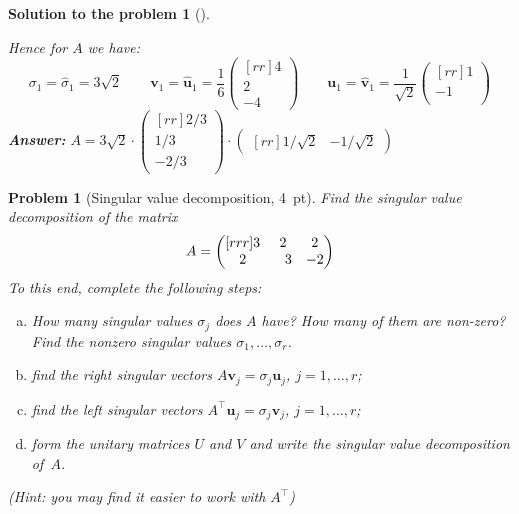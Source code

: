 \documentclass[12pt,a4]{article}
\newtheorem{problem}{Problem}
\newtheorem{solution}{Solution to the problem}
\newcommand{\bu}{{\mathbf u}}
\newcommand{\bv}{{\mathbf v}}
\newcommand{\answer}[1]{\textbf{Answer:} #1}
\begin{document}
\begin{solution}[]
\begin{enumerate}[(a)]
\begin{enumerate}[(i)]
\[\]
Hence for $A$ we have:
\[
\sigma_1 = \hat \sigma_1 = 3 \sqrt2 
\qquad
\bv_1 = \hat \bu_1 =
\frac{1}{6}
\begin{pmatrix}[rr]
4 \\ 2 \\ -4
\end{pmatrix}
\qquad
\bu_1 = \hat \bv_1 =
\frac1{\sqrt2}
\begin{pmatrix}[rr] 1 \\ -1 \\ \end{pmatrix}
\]
\answer{$
A = 
3 \sqrt2 
\cdot
\begin{pmatrix}[rr]
2/3 \\ 1/3 \\ -2/3
\end{pmatrix}
\cdot
\begin{pmatrix}[rr] 1/\sqrt2 & -1/\sqrt2 \end{pmatrix}
$}\\[10pt]
\end{enumerate}
\end{enumerate}
\end{solution}


\begin{problem}[Singular value decomposition, 4~pt]\label{prb:13.3}\rm
Find the singular value decomposition of the matrix 
\[
     A = 
    \begin{pmatrix}[rrr]
   		  3 & 2 & 2 \\ 2 & \hphantom{-}3 & -2
    \end{pmatrix}
\]
To this end, complete the following steps:
\begin{enumerate}[(a)]
  \item How many singular values $\sigma_j$ does $A$ have? How many of them are non-zero? Find the nonzero singular values $\sigma_1,\dots,\sigma_r$.
  \item find the right singular vectors $A \bv_j = \sigma_j \bu_j$, $j=1,\dots, r$;
  \item find the left singular vectors $A^\top \bu_j = \sigma_j \bv_j$, $j=1,\dots, r$;
  \item form the unitary matrices $U$ and $V$ and write the singular value decomposition of~$A$.
\end{enumerate}

(\small{\textsf{Hint: you may find it easier to work with $A^\top$}})
\end{problem}
\end{document}
